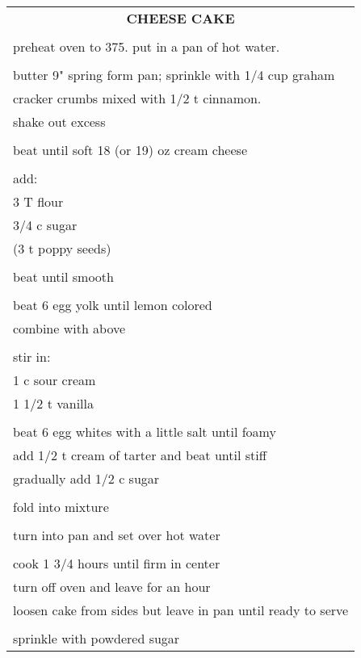 \documentclass[8pt]{report}
\begin{document}
\begin{tabular}{|l|} \hline	%
 
\multicolumn{1}{|c|}{\textbf{CHEESE CAKE}}
\\
\\

\index{desserts!cheese cake} \index{cheese cake}

preheat oven to 375.  put in a pan of hot water.\\
\\
butter 9" spring form pan; sprinkle with 1/4 cup graham\\
cracker crumbs mixed with 1/2 t cinnamon.\\
shake out excess\\
\\
beat until soft 18 (or 19) oz cream cheese\\
\\
add:\\
\hspace{0.5 in}	3 T flour\\
\hspace{0.5 in}	3/4 c sugar\\
\hspace{0.5 in}	(3 t poppy seeds)\\
	\\
beat until smooth\\
\\
beat 6 egg yolk until lemon colored\\
combine with above\\
\\
stir in: \\
\hspace{0.5 in}	1 c sour cream\\
\hspace{0.5 in}	1 1/2 t vanilla\\
\\
beat 6 egg whites with a little salt until foamy\\
add 1/2 t cream of tarter and beat until stiff\\
gradually add 1/2 c sugar\\
\\
fold into mixture\\
\\
turn into pan and set over hot water\\
\\
cook 1 3/4 hours until firm in center\\
turn off oven and leave for an hour\\
loosen cake from sides but leave in pan until ready to serve\\
\\
sprinkle with powdered sugar\\

\hline

\end{tabular}
\end{document}
